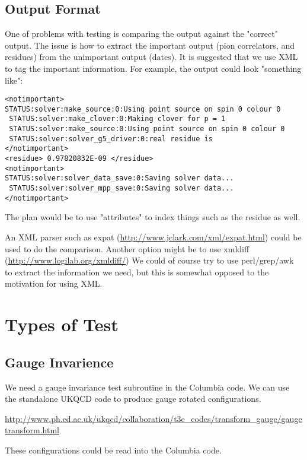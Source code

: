 \documentclass[12pt]{article}
\begin{document}
\subsection{Output Format}
One of problems with testing is comparing the output against the "correct" output. The issue is how to extract the important output (pion correlators, and residues) from the unimportant output (dates).  It is suggested that we use XML to tag the important information. 
For example, the output could look "something like":
\begin{verbatim}
<notimportant>
STATUS:solver:make_source:0:Using point source on spin 0 colour 0
 STATUS:solver:make_clover:0:Making clover for p = 1
 STATUS:solver:make_source:0:Using point source on spin 0 colour 0
 STATUS:solver:solver_g5_driver:0:real residue is  
</notimportant>
<residue> 0.97820832E-09 </residue>
<notimportant>
STATUS:solver:solver_data_save:0:Saving solver data...
 STATUS:solver:solver_mpp_save:0:Saving solver data...
</notimportant>
\end{verbatim}
The plan would be to use "attributes" to index
things such as the residue as well.

An XML parser such as expat (\href{http://www.jclark.com/xml/expat.html}{http://www.jclark.com/xml/expat.html})
could be used to do the comparison.  Another option might be to use xmldiff 
(\href{http://www.logilab.org/xmldiff/}{http://www.logilab.org/xmldiff/})
We could of course try to use perl/grep/awk to extract the 
information we need, but this is somewhat opposed to the motivation for using XML.


\section{Types of Test}

\subsection{Gauge Invarience}
We need a gauge invariance test subroutine in the Columbia code.  We can use the standalone UKQCD code to  produce gauge rotated configurations. 

   \href{http://www.ph.ed.ac.uk/ukqcd/collaboration/t3e_codes/transform_gauge/gaugetransform.html}{http://www.ph.ed.ac.uk/ukqcd/collaboration/t3e\_codes/transform\_gauge/gaugetransform.html}

These configurations could be read into the Columbia code.
\end{document}
